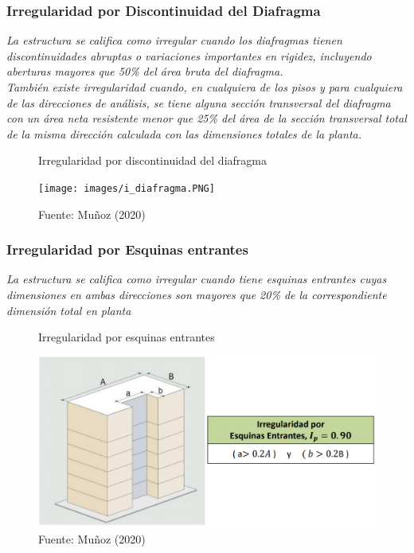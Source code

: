 \documentclass{article}%
\begin{document}
%
\subsubsection{Irregularidad por Discontinuidad del Diafragma}%
\label{ssubsec:IrregularidadporDiscontinuidaddelDiafragma}%
\begin{tcolorbox}[colback=gray!5!white,colframe=cyan!75!black,fonttitle=\bfseries,title=Tabla N°9 E-030]%
\textit{La estructura se califica como irregular cuando los diafragmas tienen discontinuidades abruptas o variaciones importantes en rigidez, incluyendo aberturas mayores que 50\% del área bruta del diafragma.} \\ \textit{También  existe  irregularidad  cuando,  en  cualquiera de  los pisos y para cualquiera de las direcciones de análisis, se tiene alguna sección transversal del diafragma con un área neta resistente menor que 25\% del área de la sección transversal total de la misma dirección calculada con las dimensiones totales de la planta.}%
\end{tcolorbox}%
\vspace{-10pt}%


\begin{figure}[H]%
\centering%
\caption{Irregularidad por discontinuidad del diafragma}%
\texttt{[image: images/i\_diafragma.PNG]}%
\caption*{\small Fuente: Muñoz (2020)}%
\end{figure}

%
\subsubsection{Irregularidad por Esquinas entrantes}%
\label{ssubsec:IrregularidadporEsquinasentrantes}%
\begin{tcolorbox}[colback=gray!5!white,colframe=cyan!75!black,fonttitle=\bfseries,title=Tabla N°9 E-030]%
\textit{La estructura se califica como irregular cuando tiene esquinas entrantes  cuyas  dimensiones  en  ambas  direcciones  son mayores que 20\% de la correspondiente dimensión total en planta}%
\end{tcolorbox}%


\begin{figure}[H]%
\centering%
\caption{Irregularidad por esquinas entrantes}%
\includegraphics[scale=0.5]{images/i_esquinas.PNG}%
\caption*{\small Fuente: Muñoz (2020)}%
\end{figure}
\end{document}
